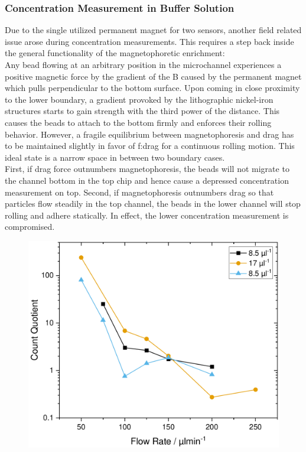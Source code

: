 \subsubsection{Concentration Measurement in Buffer Solution}
Due to the single utilized permanent magnet for two sensors, another field related issue arose during concentration measurements. This requires a step back inside the general functionality of the magnetophoretic enrichment:\\
Any bead flowing at an arbitrary position in the microchannel experiences a positive magnetic force by the gradient of the \acrlong{B} caused by the permanent magnet which pulls perpendicular to the bottom surface. Upon coming in close proximity to the lower boundary, a gradient provoked by the lithographic nickel-iron structures starts to gain strength with the third power of the distance. This causes the beads to attach to the bottom firmly and enforces their rolling behavior. However, a fragile equilibrium between magnetophoresis and drag has to be maintained slightly in favor of \acrlong{f:drag} for a continuous rolling motion. This ideal state is a narrow space in between two boundary cases. \\
First, if drag force outnumbers magnetophoresis, the beads will not migrate to the channel bottom in the top chip and hence cause a depressed concentration measurement on top. Second, if magnetophoresis outnumbers drag so that particles flow steadily in the top channel, the beads in the lower channel will stop rolling and adhere statically. In effect, the lower concentration measurement is compromised.\\
\begin{figure}[h!]
	\centering
	\includegraphics[width=.7\linewidth]{Ressources/Differential/Differential}
	\label{fig:diff:optimum}
\end{figure}

